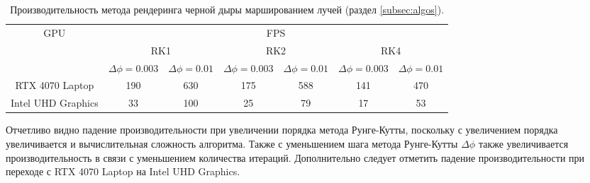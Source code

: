 \begin{center}
    \begin{table}[h!]
        \centering
        \begin{tabular}{|c|cccccc|}
        \hline
        \multirow{3}{*}{GPU} & \multicolumn{6}{c|}{FPS}                                                                                                                                                                                                                      \\ \cline{2-7} 
                             & \multicolumn{2}{c|}{RK1}                                                             & \multicolumn{2}{c|}{RK2}                                                             & \multicolumn{2}{c|}{RK4}                                        \\ \cline{2-7} 
                             & \multicolumn{1}{c|}{$\Delta\phi = 0.003$} & \multicolumn{1}{c|}{$\Delta\phi = 0.01$} & \multicolumn{1}{c|}{$\Delta\phi = 0.003$} & \multicolumn{1}{c|}{$\Delta\phi = 0.01$} & \multicolumn{1}{c|}{$\Delta\phi = 0.003$} & $\Delta\phi = 0.01$ \\ \hline
        RTX 4070 Laptop      & \multicolumn{1}{c|}{190}                  & \multicolumn{1}{c|}{630}                 & \multicolumn{1}{c|}{175}                  & \multicolumn{1}{c|}{588}                 & \multicolumn{1}{c|}{141}                  & 470                 \\ \hline
        Intel UHD Graphics   & \multicolumn{1}{c|}{33}                   & \multicolumn{1}{c|}{100}                 & \multicolumn{1}{c|}{25}                   & \multicolumn{1}{c|}{79}                  & \multicolumn{1}{c|}{17}                   & 53                  \\ \hline
        \end{tabular}
        \caption{Производительность метода рендеринга черной дыры маршированием лучей (раздел \ref{subsec:algos}).}
        \label{tab:results_raymarching}
    \end{table}
\end{center}

Отчетливо видно падение производительности при увеличении порядка метода Рунге-Кутты, поскольку с увеличением порядка увеличивается и вычислительная сложность алгоритма. Также с уменьшением шага метода Рунге-Кутты $\Delta\phi$ также увеличивается производительность в связи с уменьшением количества итераций. Дополнительно следует отметить падение производительности при переходе с RTX 4070 Laptop на Intel UHD Graphics.

